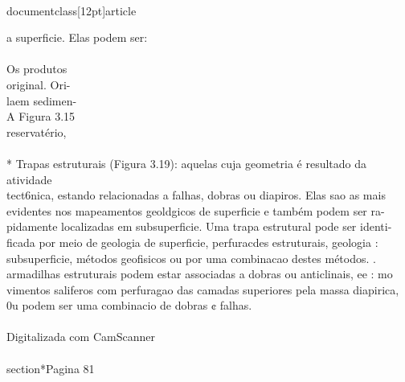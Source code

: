 \\documentclass[12pt]{article}
\begin{document}
a superficie. Elas podem ser:\\
\\
Os produtos\\
original. Ori-\\
laem sedimen-\\
A Figura 3.15\\
reservatério,\\
\\
* Trapas estruturais (Figura 3.19): aquelas cuja geometria é resultado da atividade\\
tect6nica, estando relacionadas a falhas, dobras ou diapiros. Elas sao as mais\\
evidentes nos mapeamentos geoldgicos de superficie e também podem ser ra-\\
pidamente localizadas em subsuperficie. Uma trapa estrutural pode ser identi-\\
ficada por meio de geologia de superficie, perfuracdes estruturais, geologia :\\
subsuperficie, métodos geofisicos ou por uma combinacao destes métodos. .\\
armadilhas estruturais podem estar associadas a dobras ou anticlinais, ee : mo\\
vimentos saliferos com perfuragao das camadas superiores pela massa diapirica,\\
0u podem ser uma combinacio de dobras ¢ falhas.\\
\\
Digitalizada com CamScanner\\

\\section*{Pagina 81}
\end{document}
